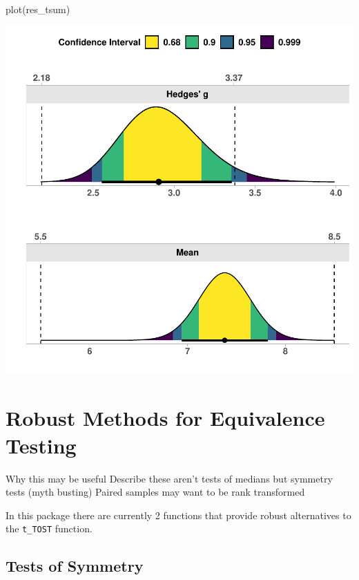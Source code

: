 \documentclass[]{interact}
\theoremstyle{plain}%
\theoremstyle{definition}
\theoremstyle{remark}
\newenvironment{Shaded}{\begin{snugshade}}{\end{snugshade}}
\newcommand{\FunctionTok}[1]{\textcolor[rgb]{0.00,0.00,0.00}{#1}}
\newcommand{\NormalTok}[1]{#1}
\begin{document}
\begin{Shaded}
\begin{Highlighting}[]
\FunctionTok{plot}\NormalTok{(res\_tsum)}
\end{Highlighting}
\end{Shaded}

\includegraphics{Avocado_Update_files/figure-latex/unnamed-chunk-15-1.pdf}

\hypertarget{robust-methods-for-equivalence-testing}{%
\section{Robust Methods for Equivalence
Testing}\label{robust-methods-for-equivalence-testing}}

Why this may be useful Describe these aren't tests of medians but
symmetry tests (myth busting) Paired samples may want to be rank
transformed

In this package there are currently 2 functions that provide robust
alternatives to the \texttt{t\_TOST} function.

\hypertarget{tests-of-symmetry}{%
\subsection{Tests of Symmetry}\label{tests-of-symmetry}}
\end{document}
